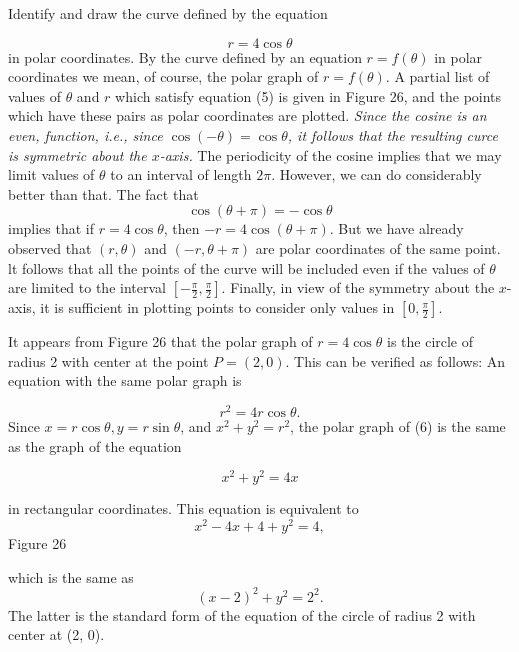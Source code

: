 \begin{example} Identify and draw the curve defined by the equation 
 
\begin{equation}
r = 4 \cos \theta   
\label{eq10.6.5}
\end{equation}
\noindent in polar coordinates. By the curve defined by an equation $r = f(\theta)$ in polar coordinates we mean, of course, the polar graph of $r = f(\theta)$. A partial list of values of $\theta$ and $r$ which satisfy equation (5) is given in Figure 26, and the points which have these pairs as polar coordinates are plotted. \textit{Since the cosine is an even, function, i.e., since $\cos(-\theta) = \cos \theta$, it follows that the resulting curce is symmetric about the $x$-axis.}  The periodicity of the cosine implies that we may limit values of $\theta$ to an interval of length $2\pi$. However, we can do considerably better than that. The fact that
$$
\cos(\theta + \pi) = -\cos \theta
$$
\noindent implies that if $r = 4 \cos \theta$, then $-r = 4 \cos(\theta + \pi)$. But we have already observed that $(r, \theta)$ and $(-r, \theta + \pi)$ are polar coordinates of the same point. lt follows that all the points of the curve will be included even if the values of $\theta$ are limited to the interval $[-\frac{\pi}{2}, \frac{\pi}{2}]$. Finally, in view of the symmetry about the $x$-axis, it is sufficient in plotting points to consider only values in $[0,\frac{\pi}{2}]$.

It appears from Figure 26 that the polar graph of $r = 4 \cos \theta$ is the circle of radius 2 with center at the point $P = (2, 0)$. This can be verified as follows: An equation with the same polar graph is

\begin{equation}
r^2 = 4r \cos \theta. 
\label{eq10.6.6}
\end{equation}
\noindent Since $x = r \cos \theta, y = r \sin \theta$, and $x^2 + y^2 = r^2$, the polar graph of (6) is the same as the graph of the equation 

$$
x^2 + y^2 = 4x
$$

\noindent in rectangular coordinates. This equation is equivalent to 
$$
x^2 - 4x + 4 + y^2 = 4,
$$
Figure 26 

\noindent which is the same as
$$
(x - 2)^2 + y^2 = 2^2.
$$
\noindent The latter is the standard form of the equation of the circle of radius 2 with center at (2, 0).
\end{example}

